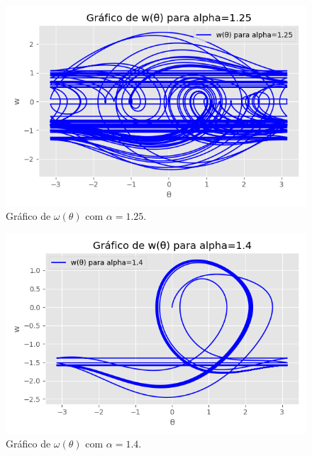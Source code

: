 \documentclass[12pt,a4paper]{article}
\begin{document}
\begin{figure}[H]
\centering
\includegraphics[width=\textwidth]{../tarefa-4b/grafico_w_theta_alpha_1.25.png}
\caption{Gráfico de $\omega(\theta)$ com $\alpha = 1.25$.}
\end{figure}

\begin{figure}[H]
\centering
\includegraphics[width=\textwidth]{../tarefa-4b/grafico_w_theta_alpha_1.4.png}
\caption{Gráfico de $\omega(\theta)$ com $\alpha = 1.4$.}
\end{figure}
\end{document}
